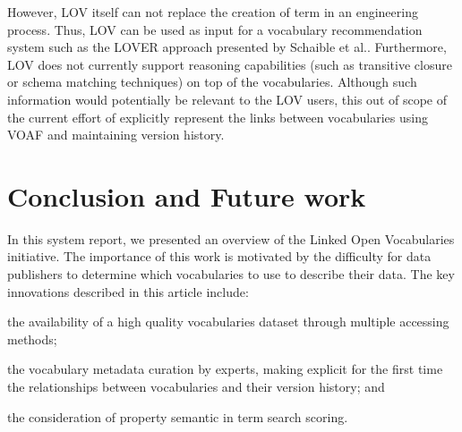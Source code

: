 \documentclass{iosart2c}
\begin{document}
However, LOV itself can not replace the creation of term in an engineering process. Thus, LOV can be used as input for a vocabulary recommendation system such as the LOVER approach presented by Schaible et al.\cite{schaible2013lover}. Furthermore, LOV does not currently support reasoning capabilities (such as transitive closure or schema matching techniques) on top of the vocabularies. Although such information would potentially be relevant to the LOV users, this  out of scope of the current effort of explicitly represent the links between vocabularies using VOAF and maintaining version history.


		
%							
%   


\section{Conclusion and Future work}
\label{sec:conclusion}
In this system report, we presented an overview of the Linked Open Vocabularies initiative. The importance of this work is motivated by the difficulty for data publishers to determine which vocabularies to use to describe their data. The key innovations described in this article include: 
\begin{inparaenum}[1)] 
	\item the availability of a high quality vocabularies dataset through multiple accessing methods;
	\item the vocabulary metadata curation by experts, making explicit for the first time the relationships between vocabularies and their version history; and
	\item the consideration of property semantic in term search scoring.
\end{inparaenum}
\end{document}
